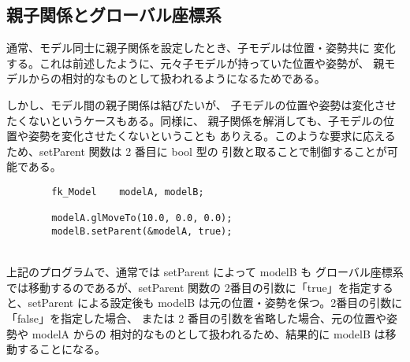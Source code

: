 \subsection{親子関係とグローバル座標系}\label{subsec:modelglobal}
通常、モデル同士に親子関係を設定したとき、子モデルは位置・姿勢共に
変化する。これは前述したように、元々子モデルが持っていた位置や姿勢が、
親モデルからの相対的なものとして扱われるようになるためである。

しかし、モデル間の親子関係は結びたいが、
子モデルの位置や姿勢は変化させたくないというケースもある。同様に、
親子関係を解消しても、子モデルの位置や姿勢を変化させたくないということも
ありえる。このような要求に応えるため、setParent 関数は 2 番目に bool 型の
引数と取ることで制御することが可能である。
\\
\begin{breakbox}
\begin{verbatim}
        fk_Model    modelA, modelB;

        modelA.glMoveTo(10.0, 0.0, 0.0);
        modelB.setParent(&modelA, true);
\end{verbatim}
\end{breakbox}
~ \\
上記のプログラムで、通常では setParent によって modelB も
グローバル座標系では移動するのであるが、setParent 関数の
2番目の引数に「true」を指定すると、setParent による設定後も
modelB は元の位置・姿勢を保つ。2番目の引数に「false」を指定した場合、
または 2 番目の引数を省略した場合、元の位置や姿勢や modelA からの
相対的なものとして扱われるため、結果的に modelB は移動することになる。

